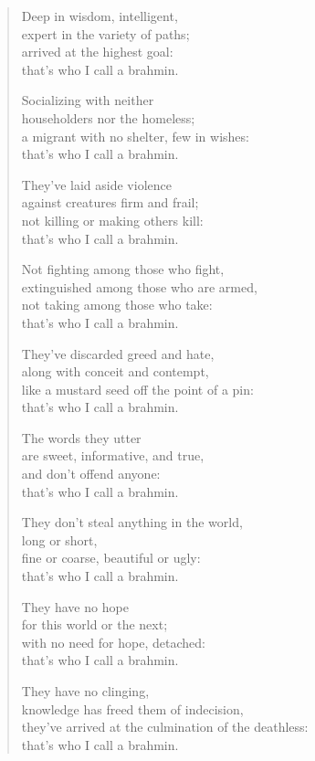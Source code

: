 \documentclass[12pt,openany]{book}%
\begin{document}
\begin{verse}
Deep in wisdom, intelligent, \\
expert in the variety of paths; \\
arrived at the highest goal: \\
that’s who I call a brahmin. 

Socializing with neither \\
householders nor the homeless; \\
a migrant with no shelter, few in wishes: \\
that’s who I call a brahmin. 

They’ve laid aside violence \\
against creatures firm and frail; \\
not killing or making others kill: \\
that’s who I call a brahmin. 

Not fighting among those who fight, \\
extinguished among those who are armed, \\
not taking among those who take: \\
that’s who I call a brahmin. 

They’ve discarded greed and hate, \\
along with conceit and contempt, \\
like a mustard seed off the point of a pin: \\
that’s who I call a brahmin. 

The words they utter \\
are sweet, informative, and true, \\
and don’t offend anyone: \\
that’s who I call a brahmin. 

They don’t steal anything in the world, \\
long or short, \\
fine or coarse, beautiful or ugly: \\
that’s who I call a brahmin. 

They have no hope \\
for this world or the next; \\
with no need for hope, detached: \\
that’s who I call a brahmin. 

They have no clinging, \\
knowledge has freed them of indecision, \\
they’ve arrived at the culmination of the deathless: \\
that’s who I call a brahmin. 


\end{verse}
\end{document}
